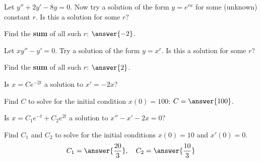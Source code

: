 \documentclass{ximera}
\begin{document}
\begin{exercise}
    Let $y'' + 2y' - 8y = 0$.  Now try a solution of the form $y = e^{rx}$ for some (unknown) constant $r$.  Is this a solution for some $r$?    
    \begin{multipleChoice}
    \end{multipleChoice}
    \begin{problem}
        Find the \textbf{sum} of all such $r$: $\answer{-2}$.
    \end{problem}
\end{exercise}

\begin{exercise}%
    Let $xy'' - y' = 0$.  Try a solution of the form $y = x^r$.  Is this a solution for some $r$?
    \begin{multipleChoice}
    \end{multipleChoice}
    \begin{problem}
        Find the \textbf{sum} of all such $r$: $\answer{2}$.
    \end{problem}
\end{exercise}

\begin{exercise}
    Is $x = C e^{-2t}$ a solution to $x' = -2x$? 
    \begin{multipleChoice}
    \end{multipleChoice}
    \begin{problem}
        Find $C$ to solve for the initial condition $x(0) = 100$: $C = \answer{100}$.
    \end{problem}
\end{exercise}

\begin{exercise}
    Is $x = C_1 e^{-t} + C_2 e^{2t}$ a solution to $x'' - x' -2 x = 0$?
    \begin{multipleChoice}
    \end{multipleChoice}
    \begin{problem}
        Find $C_1$ and $C_2$ to solve for the initial conditions $x(0) = 10$ and $x'(0) = 0$. 
        \[
            C_1 = \answer{\frac{20}{3}}, \quad C_2 = \answer{\frac{10}{3}}
        \]
    \end{problem}
\end{exercise}
\end{document}
